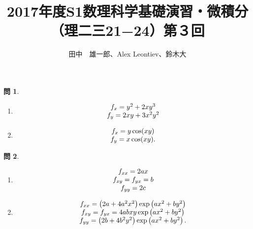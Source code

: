 \documentclass[12pt]{article} %
\title{2017年度S1数理科学基礎演習・微積分（理二三21−24）第３回}
\author{田中　雄一郎、Alex Leontiev、鈴木大}
\theoremstyle{definition}
\newtheorem{question}{問}
\begin{document}
\maketitle
\begin{question}
	\begin{enumerate}[(1)]
		\item \begin{equation*}
				\begin{array}[]{c}
					f_x=y^2+2xy^3\\
					f_y=2xy+3x^2y^2
				\end{array}
			\end{equation*}
		\item \begin{equation*}
				\begin{array}[]{c}
					f_x=y\cos(xy)\\
					f_y=x\cos(xy).
				\end{array}
			\end{equation*}
	\end{enumerate}
\end{question}
\begin{question}
	\begin{enumerate}[(1)]
		\item \begin{equation*}
				\begin{array}[]{c}
					f_{xx}=2ax\\
					f_{xy}=f_{yx}=b\\
					f_{yy}=2c
				\end{array}
			\end{equation*}
		\item\begin{equation*}
				\begin{array}[]{c}
					f_{xx}=\left( 2a+4a^2x^2 \right)\exp\left( ax^2+by^2 \right)\\
					f_{xy}=f_{yx}= 4abxy\exp\left( ax^2+by^2 \right)\\
					f_{yy}=\left( 2b+4b^2y^2 \right)\exp\left(  ax^2+by^2\right).
				\end{array}
			\end{equation*}
	\end{enumerate}
\end{question}
\end{document}
